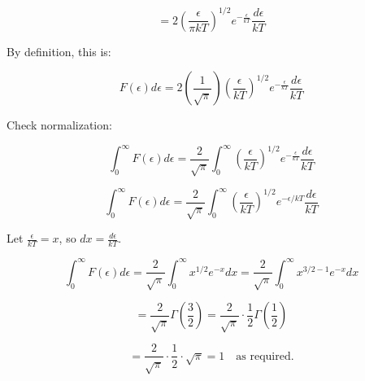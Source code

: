 \documentclass{article}
\begin{document}
\[
= 2 \left( \frac{\epsilon}{\pi kT} \right)^{1/2} e^{-\frac{\epsilon}{kT}} \frac{d\epsilon}{kT}
\]

By definition, this is:

\[
F(\epsilon) d\epsilon = 2 \left( \frac{1}{\sqrt{\pi}} \right) \left( \frac{\epsilon}{kT} \right)^{1/2} e^{-\frac{\epsilon}{kT}} \frac{d\epsilon}{kT}
\]

Check normalization:

\[
\int_0^\infty F(\epsilon) d\epsilon = \frac{2}{\sqrt{\pi}} \int_0^\infty \left( \frac{\epsilon}{kT} \right)^{1/2} e^{-\frac{\epsilon}{kT}} \frac{d\epsilon}{kT}
\]


\[
\int_0^\infty F(\epsilon) d\epsilon = \frac{2}{\sqrt{\pi}} \int_0^\infty \left( \frac{\epsilon}{kT} \right)^{1/2} e^{-\epsilon/kT} \frac{d\epsilon}{kT}
\]

Let \(\frac{\epsilon}{kT} = x\), so \(dx = \frac{d\epsilon}{kT}\).

\[
\int_0^\infty F(\epsilon) d\epsilon = \frac{2}{\sqrt{\pi}} \int_0^\infty x^{1/2} e^{-x} dx = \frac{2}{\sqrt{\pi}} \int_0^\infty x^{3/2 - 1} e^{-x} dx
\]

\[
= \frac{2}{\sqrt{\pi}} \Gamma\left(\frac{3}{2}\right) = \frac{2}{\sqrt{\pi}} \cdot \frac{1}{2} \Gamma\left(\frac{1}{2}\right)
\]

\[
= \frac{2}{\sqrt{\pi}} \cdot \frac{1}{2} \cdot \sqrt{\pi} = 1 \quad \text{as required.}
\]
\end{document}
